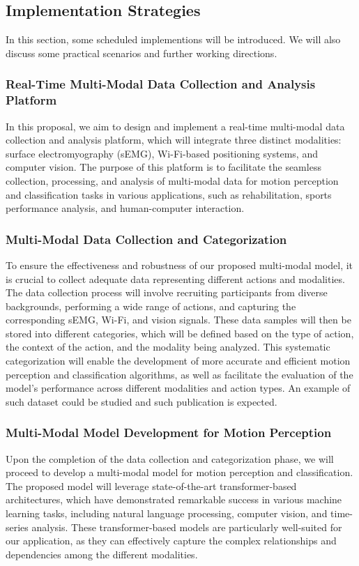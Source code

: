 \documentclass[12pt, a4paper]{article}
\begin{document}
\subsection{Implementation Strategies}
In this section, some scheduled implementions will be introduced. We will also discuss some practical scenarios and further working directions.

\subsubsection{Real-Time Multi-Modal Data Collection and Analysis Platform}
In this proposal, we aim to design and implement a real-time multi-modal data collection and analysis platform, which will integrate three distinct modalities: surface electromyography (sEMG), Wi-Fi-based positioning systems, and computer vision. The purpose of this platform is to facilitate the seamless collection, processing, and analysis of multi-modal data for motion perception and classification tasks in various applications, such as rehabilitation, sports performance analysis, and human-computer interaction.

\subsubsection{Multi-Modal Data Collection and Categorization}
To ensure the effectiveness and robustness of our proposed multi-modal model, it is crucial to collect adequate data representing different actions and modalities. The data collection process will involve recruiting participants from diverse backgrounds, performing a wide range of actions, and capturing the corresponding sEMG, Wi-Fi, and vision signals. These data samples will then be stored into different categories, which will be defined based on the type of action, the context of the action, and the modality being analyzed. This systematic categorization will enable the development of more accurate and efficient motion perception and classification algorithms, as well as facilitate the evaluation of the model's performance across different modalities and action types. An example of such dataset \cite{Atzori2014} could be studied and such publication is expected.

\subsubsection{Multi-Modal Model Development for Motion Perception}
Upon the completion of the data collection and categorization phase, we will proceed to develop a multi-modal model for motion perception and classification. The proposed model will leverage state-of-the-art transformer-based architectures, which have demonstrated remarkable success in various machine learning tasks, including natural language processing, computer vision, and time-series analysis. These transformer-based models are particularly well-suited for our application, as they can effectively capture the complex relationships and dependencies among the different modalities.
\end{document}
